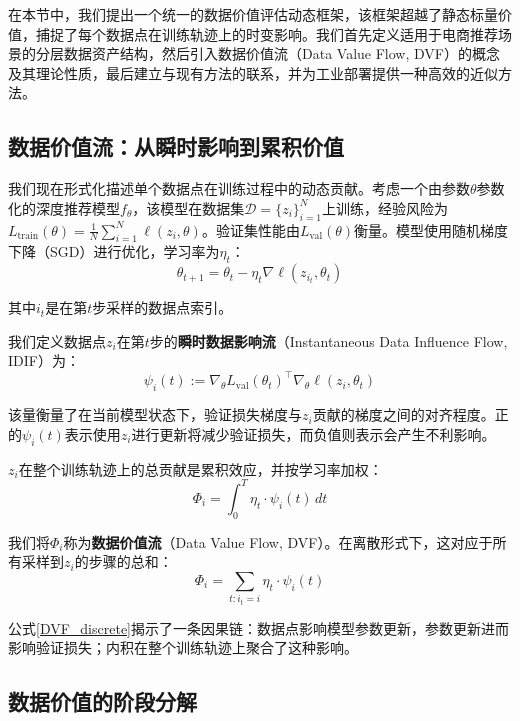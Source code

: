 在本节中，我们提出一个统一的数据价值评估动态框架，该框架超越了静态标量价值，捕捉了每个数据点在训练轨迹上的时变影响。我们首先定义适用于电商推荐场景的分层数据资产结构，然后引入数据价值流（Data Value Flow, DVF）的概念及其理论性质，最后建立与现有方法的联系，并为工业部署提供一种高效的近似方法。

\subsection{数据价值流：从瞬时影响到累积价值}

我们现在形式化描述单个数据点在训练过程中的动态贡献。考虑一个由参数\(\theta\)参数化的深度推荐模型\(f_{\theta}\)，该模型在数据集\(\mathcal{D} = \{z_i\}_{i=1}^{N}\)上训练，经验风险为\(L_{\text{train}}(\theta) = \frac{1}{N}\sum_{i=1}^N \ell(z_i,\theta)\)。验证集性能由\(L_{\text{val}}(\theta)\)衡量。模型使用随机梯度下降（SGD）进行优化，学习率为\(\eta_t\)：
\begin{equation}
\theta_{t+1} = \theta_t - \eta_t \nabla \ell(z_{i_t}, \theta_t)
\end{equation}

其中\(i_t\)是在第\(t\)步采样的数据点索引。

我们定义数据点\(z_i\)在第\(t\)步的\textbf{瞬时数据影响流}（Instantaneous Data Influence Flow, IDIF）为：
\begin{equation}
\psi_i(t) := \nabla_{\theta} L_{\text{val}}(\theta_t)^{\top} \nabla_{\theta} \ell(z_i, \theta_t)
\end{equation}

该量衡量了在当前模型状态下，验证损失梯度与\(z_i\)贡献的梯度之间的对齐程度。正的\(\psi_i(t)\)表示使用\(z_i\)进行更新将减少验证损失，而负值则表示会产生不利影响。

\(z_i\)在整个训练轨迹上的总贡献是累积效应，并按学习率加权：
\begin{equation}
\Phi_i = \int_{0}^{T} \eta_t \cdot \psi_i(t) \, dt
\end{equation}

我们将\(\Phi_i\)称为\textbf{数据价值流}（Data Value Flow, DVF）。在离散形式下，这对应于所有采样到\(z_i\)的步骤的总和：
\begin{equation}
\label{DVF_discrete}
\Phi_i = \sum_{t: i_t = i} \eta_t \cdot \psi_i(t)
\end{equation}

公式\eqref{DVF_discrete}揭示了一条因果链：数据点影响模型参数更新，参数更新进而影响验证损失；内积在整个训练轨迹上聚合了这种影响。

\subsection{数据价值的阶段分解}

